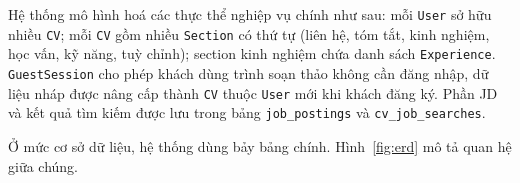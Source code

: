 \documentclass[../DoAn.tex]{subfiles}
\begin{document}
Hệ thống mô hình hoá các thực thể nghiệp vụ chính như sau: mỗi \texttt{User} sở hữu nhiều \texttt{CV}; mỗi \texttt{CV} gồm nhiều \texttt{Section} có thứ tự (liên hệ, tóm tắt, kinh nghiệm, học vấn, kỹ năng, tuỳ chỉnh); section kinh nghiệm chứa danh sách \texttt{Experience}. \texttt{GuestSession} cho phép khách dùng trình soạn thảo không cần đăng nhập, dữ liệu nháp được nâng cấp thành \texttt{CV} thuộc \texttt{User} mới khi khách đăng ký. Phần JD và kết quả tìm kiếm được lưu trong bảng \texttt{job\_postings} và \texttt{cv\_job\_searches}.

Ở mức cơ sở dữ liệu, hệ thống dùng bảy bảng chính. Hình~\ref{fig:erd} mô tả quan hệ giữa chúng.

\newcommand{\erdtable}[2]{%
  \begin{tabular}{|>{\columncolor{blue!15}}l|}
    \hline
    \textbf{\normalsize #1} \\ \hline
    \footnotesize #2 \\ \hline
  \end{tabular}%
}
\end{document}
